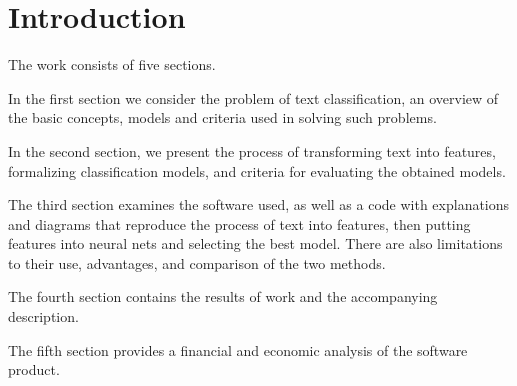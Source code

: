 \chapter*{Introduction}							%

%
%
%



The work consists of five sections.

In the first section we consider the problem of text classification, an overview of the basic concepts, models and criteria used in solving such problems.

In the second section, we present the process of transforming text into features, formalizing classification models, and criteria for evaluating the obtained models.

The third section examines the software used, as well as a code with explanations and diagrams that reproduce the process of text into features, then putting features into neural nets and selecting the best model. There are also limitations to their use, advantages, and comparison of the two methods.

The fourth section contains the results of work and the accompanying description.

The fifth section provides a financial and economic analysis of the software product.